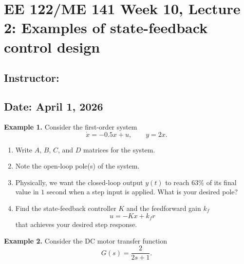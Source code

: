 \documentclass{ee122_notes}
\renewcommand{\releasedate}{April 1, 2026}
\begin{document}
\section*{EE 122/ME 141 Week 10, Lecture 2: Examples of state-feedback control design}
\subsection*{Instructor: \instructor}
\subsection*{Date: \releasedate}


\textbf{Example 1.} Consider the first-order system
\[
\dot{x} = -0.5x + u, \qquad y = 2x.
\]

\begin{enumerate}[label=\textbf{Task \arabic*.}, leftmargin=*]

\item Write \(A\), \(B\), \(C\), and \(D\) matrices for the system.

\vspace{1.5cm}

\item Note the open-loop pole(s) of the system.

\vspace{0.5cm}

\item Physically, we want the closed-loop output \(y(t)\) to reach \(63\%\) of its final value in \(1\) second when a step input is applied. What is your desired pole?



\vspace{2.3cm}

\item Find the state-feedback controller $K$ and the feedforward gain \(k_f\)
\[
u=-Kx + k_f r
\]
that achieves your desired step response.

\vspace{1.8cm}

\end{enumerate}

\textbf{Example 2.} Consider the DC motor transfer function
\[
G(s)=\frac{2}{2s+1}.
\]
\end{document}
